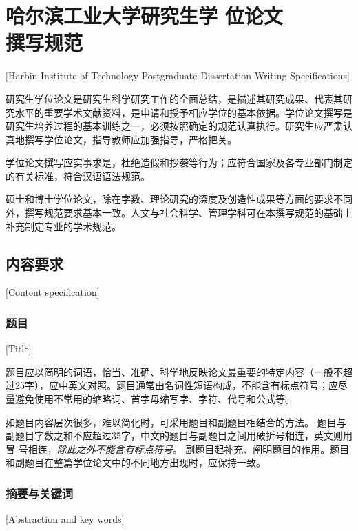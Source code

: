 

\chapter[哈尔滨工业大学研究生学位论文撰写规范]{哈尔滨工业大学研究生学
  位论文\protect\\撰写规范}[Harbin Institute of Technology Postgraduate Dissertation Writing Specifications]

研究生学位论文是研究生科学研究工作的全面总结，是描述其研究成果、代表其研究水平的重要学术文献资料，是申请和授予相应学位的基本依据。学位论文撰写是研究生培养过程的基本训练之一，必须按照确定的规范认真执行。研究生应严肃认真地撰写学位论文，指导教师应加强指导，严格把关。

学位论文撰写应实事求是，杜绝造假和抄袭等行为；应符合国家及各专业部门制定的有关标准，符合汉语语法规范。

硕士和博士学位论文，除在字数、理论研究的深度及创造性成果等方面的要求不同外，撰写规范要求基本一致。人文与社会科学、管理学科可在本撰写规范的基础上补充制定专业的学术规范。

\section{内容要求}[Content specification]

\subsection{题目}[Title]

题目应以简明的词语，恰当、准确、科学地反映论文最重要的特定内容（一般不超过25字），应中英文对照。题目通常由名词性短语构成，不能含有标点符号；应尽量避免使用不常用的缩略词、首字母缩写字、字符、代号和公式等。

如题目内容层次很多，难以简化时，可采用题目和副题目相结合的方法。
题目与副题目字数之和不应超过35字，中文的题目与副题目之间用破折号相连，英文则用冒
号相连，\emph{除此之外不能含有标点符号}。
副题目起补充、阐明题目的作用。题目和副题目在整篇学位论文中的不同地方出现时，应保持一致。

\subsection{摘要与关键词}[Abstraction and key words]
